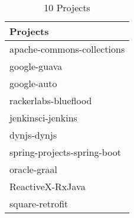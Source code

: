 \begin{table*}
\begin{small}
\begin{center}
\caption{10 Projects}
\begin{tabular}{l}
\toprule
Projects \\
\midrule
   apache-commons-collections \\
google-guava\\
google-auto\\
rackerlabs-blueflood\\
jenkinsci-jenkins\\
dynjs-dynjs\\
spring-projects-spring-boot\\
oracle-graal\\
ReactiveX-RxJava\\
square-retrofit\\
\bottomrule
\end{tabular}
\end{center}
\end{small}
\vspace{\TVDatasetMetrics}
\end{table*}


